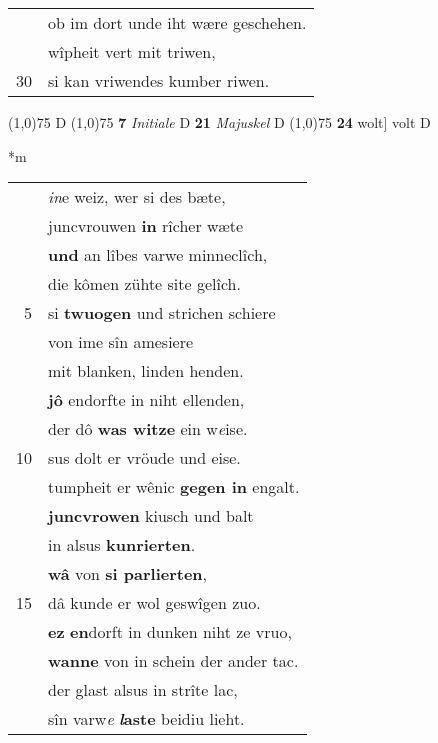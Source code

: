 \documentclass[8pt,a4paper,notitlepage]{article}
\begin{document}
\begin{table}[ht]
\begin{minipage}[t]{0.5\linewidth}
\begin{tabular}{rl}
 & ob im dort unde iht wære geschehen.\\ 
 & wîpheit vert mit triwen,\\ 
30 & si kan vriwendes kumber riwen.\\ 
\end{tabular}
\scriptsize
\line(1,0){75} \newline
D \newline
\line(1,0){75} \newline
\textbf{7} \textit{Initiale} D  \textbf{21} \textit{Majuskel} D  \newline
\line(1,0){75} \newline
\textbf{24} wolt] volt D \newline
\end{minipage}
\hspace{0.5cm}
\begin{minipage}[t]{0.5\linewidth}
\small
\begin{center}*m
\end{center}
\begin{tabular}{rl}
 & \textit{in}e weiz, wer si des bæte,\\ 
 & juncvrouwen \textbf{in} rîcher wæte\\ 
 & \textbf{und} an lîbes varwe minneclîch,\\ 
 & die kômen zühte site gelîch.\\ 
5 & si \textbf{twuogen} und strichen schiere\\ 
 & von ime sîn amesiere\\ 
 & mit blanken, linden henden.\\ 
 & \textbf{jô} endorfte in niht ellenden,\\ 
 & der dô \textbf{was witze} ein w\textit{e}ise.\\ 
10 & sus dolt er vröude und eise.\\ 
 & tumpheit er wênic \textbf{gegen in} engalt.\\ 
 & \textbf{juncvrowen} kiusch und balt\\ 
 & in alsus \textbf{kunrierten}.\\ 
 & \textbf{wâ} von \textbf{si parlierten},\\ 
15 & dâ kunde er wol geswîgen zuo.\\ 
 & \textbf{ez} \textbf{en}dorft in dunken niht ze vruo,\\ 
 & \textbf{wanne} von in schein der ander tac.\\ 
 & der glast alsus in strîte lac,\\ 
 & sîn varw\textit{e} \textbf{\textit{l}aste} beidiu lieht.\\ 

\end{tabular}
\end{minipage}
\end{table}
\end{document}

